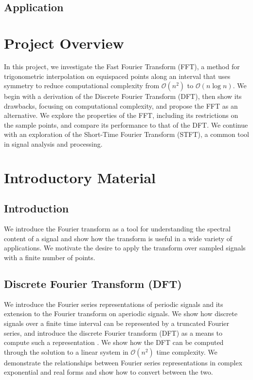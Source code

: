 \documentclass[10pt]{article}
\begin{document}
\subsection{Application}


\noindent\makebox[\linewidth]{\rule{\paperwidth}{0.94pt}}

\section{Project Overview}

In this project, we investigate the Fast Fourier Transform (FFT), a method for trigonometric interpolation on equispaced points along an interval that uses symmetry to reduce computational complexity from $\mathcal{O}(n^2)$ to $\mathcal{O}(n\log n)$. We begin with a derivation of the Discrete Fourier Transform (DFT), then show its drawbacks, focusing on computational complexity, and propose the FFT as an alternative. We explore the properties of the FFT, including its restrictions on the sample points, and compare its performance to that of the DFT. We continue with an exploration of the Short-Time Fourier Transform (STFT), a common tool in signal analysis and processing.

\section{Introductory Material}

\subsection{Introduction}
We introduce the Fourier transform as a tool for understanding the spectral content of a signal and show how the transform is useful in a wide variety of applications. We motivate the desire to apply the transform over sampled signals with a finite number of points.

\subsection{Discrete Fourier Transform (DFT)}

We introduce the Fourier series representations of periodic signals and its extension to the Fourier transform on aperiodic signals. We show how discrete signals over a finite time interval can be represented by a truncated Fourier series, and introduce the discrete Fourier transform (DFT) as a means to compute such a representation \cite{oppenheim1997signals}. We show how the DFT can be computed through the solution to a linear system in $\mathcal{O}(n^2)$ time complexity. We demonstrate the relationships between Fourier series representations in complex exponential and real forms and show how to convert between the two.
\end{document}
